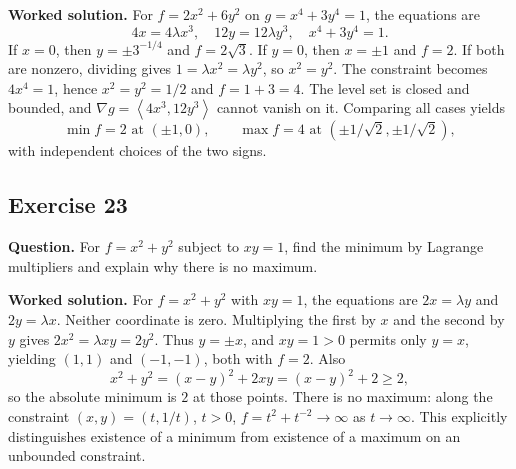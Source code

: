 \documentclass[11pt]{article}
\newcommand{\ex}[1]{\Needspace{8\baselineskip}\subsection*{Exercise #1}}
\newcommand{\ans}[1]{\boxed{#1}}
\newcommand{\vv}[1]{\left\langle #1\right\rangle}
\begin{document}
\textbf{Worked solution.}
For $f=2x^2+6y^2$ on $g=x^4+3y^4=1$, the equations are
\[4x=4\lambda x^3,\quad12y=12\lambda y^3,\quad x^4+3y^4=1.\]
If $x=0$, then $y=\pm3^{-1/4}$ and $f=2\sqrt3$. If $y=0$, then $x=\pm1$ and $f=2$. If both are nonzero, dividing gives $1=\lambda x^2=\lambda y^2$, so $x^2=y^2$. The constraint becomes $4x^4=1$, hence $x^2=y^2=1/2$ and $f=1+3=4$. The level set is closed and bounded, and $\nabla g=\vv{4x^3,12y^3}$ cannot vanish on it. Comparing all cases yields
\[\ans{\min f=2\text{ at }(\pm1,0)},\qquad
\ans{\max f=4\text{ at }(\pm1/\sqrt2,\pm1/\sqrt2)},\]
with independent choices of the two signs.
\ex{23}
\textbf{Question.} For $f=x^2+y^2$ subject to $xy=1$, find the minimum by Lagrange multipliers and explain why there is no maximum.

\textbf{Worked solution.}
For $f=x^2+y^2$ with $xy=1$, the equations are $2x=\lambda y$ and $2y=\lambda x$. Neither coordinate is zero. Multiplying the first by $x$ and the second by $y$ gives $2x^2=\lambda xy=2y^2$. Thus $y=\pm x$, and $xy=1>0$ permits only $y=x$, yielding $(1,1)$ and $(-1,-1)$, both with $f=2$. Also
\[x^2+y^2=(x-y)^2+2xy=(x-y)^2+2\ge2,\]
so the absolute minimum is $\ans{2}$ at those points. There is no maximum: along the constraint $(x,y)=(t,1/t)$, $t>0$, $f=t^2+t^{-2}\to\infty$ as $t\to\infty$. This explicitly distinguishes existence of a minimum from existence of a maximum on an unbounded constraint.
\end{document}
